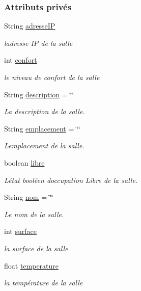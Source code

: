 \subsubsection*{Attributs privés}
\begin{DoxyCompactItemize}
\item 
String \hyperlink{classcom_1_1lasalle_1_1meeting_1_1_salle_ad83f4f49123c8d02f2fc0da484d3e812}{adresse\+IP}
\begin{DoxyCompactList}\small\item\em l\textquotesingle{}adresse IP de la salle \end{DoxyCompactList}\item 
int \hyperlink{classcom_1_1lasalle_1_1meeting_1_1_salle_ac165425fc78429c38042a0fed650b9ee}{confort}
\begin{DoxyCompactList}\small\item\em le niveau de confort de la salle \end{DoxyCompactList}\item 
String \hyperlink{classcom_1_1lasalle_1_1meeting_1_1_salle_a79547b79b4e812619f6cc764dbe7a80b}{description} = \char`\"{}\char`\"{}
\begin{DoxyCompactList}\small\item\em La description de la salle. \end{DoxyCompactList}\item 
String \hyperlink{classcom_1_1lasalle_1_1meeting_1_1_salle_a9e31fc4d4c9125e511db52da3254bcba}{emplacement} = \char`\"{}\char`\"{}
\begin{DoxyCompactList}\small\item\em L\textquotesingle{}emplacement de la salle. \end{DoxyCompactList}\item 
boolean \hyperlink{classcom_1_1lasalle_1_1meeting_1_1_salle_a2965cb92b06dcdd28a07fa550259b1c1}{libre}
\begin{DoxyCompactList}\small\item\em L\textquotesingle{}état booléen d\textquotesingle{}occupation Libre de la salle. \end{DoxyCompactList}\item 
String \hyperlink{classcom_1_1lasalle_1_1meeting_1_1_salle_a3641e82a9fa78c5dc8bd9a5b92bae482}{nom} = \char`\"{}\char`\"{}
\begin{DoxyCompactList}\small\item\em Le nom de la salle. \end{DoxyCompactList}\item 
int \hyperlink{classcom_1_1lasalle_1_1meeting_1_1_salle_a1b761514679fa5f98e71809fea448384}{surface}
\begin{DoxyCompactList}\small\item\em la surface de la salle \end{DoxyCompactList}\item 
float \hyperlink{classcom_1_1lasalle_1_1meeting_1_1_salle_a31600559f77e2eeb1f6aa150b203213e}{temperature}
\begin{DoxyCompactList}\small\item\em la température de la salle \end{DoxyCompactList}\end{DoxyCompactItemize}
